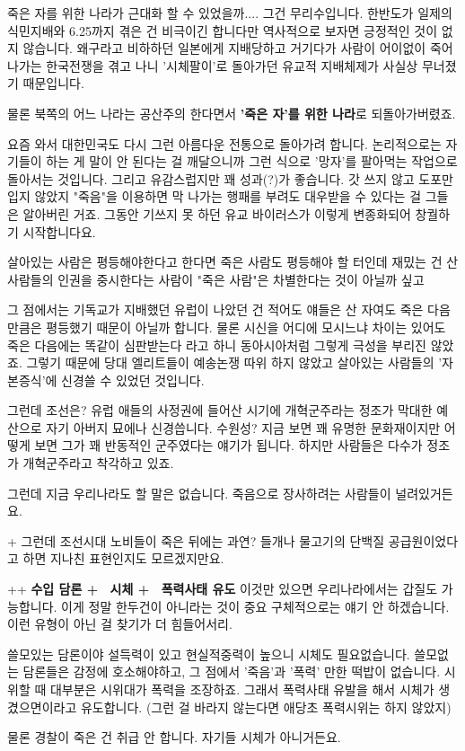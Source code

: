 죽은 자를 위한 나라가 근대화 할 수 있었을까.... 그건 무리수입니다.
한반도가 일제의 식민지배와 6.25까지 겪은 건 비극이긴 합니다만 역사적으로 보자면 긍정적인 것이 없지 않습니다.
왜구라고 비하하던 일본에게 지배당하고 거기다가 사람이 어이없이 죽어나가는 한국전쟁을 겪고 나니
'시체팔이'로 돌아가던 유교적 지배체제가 사실상 무너졌기 때문입니다.
\vspace{5mm}

물론 북쪽의 어느 나라는 공산주의 한다면서 \textbf{'죽은 자'를 위한 나라}로 되돌아가버렸죠.
\vspace{5mm}

요즘 와서 대한민국도 다시 그런 아름다운 전통으로 돌아가려 합니다.
논리적으로는 자기들이 하는 게 말이 안 된다는 걸 깨달으니까 그런 식으로 '망자'를 팔아먹는 작업으로 돌아서는 것입니다.
그리고 유감스럽지만 꽤 성과(?)가 좋습니다.
갓 쓰지 않고 도포만 입지 않았지 "죽음"을 이용하면 막 나가는 행패를 부려도 대우받을 수 있다는 걸 그들은 알아버린 거죠.
그동안 기쓰지 못 하던 유교 바이러스가 이렇게 변종화되어 창궐하기 시작합니다요.
\vspace{5mm}

살아있는 사람은 평등해야한다고 한다면 죽은 사람도 평등해야 할 터인데
재밌는 건 산 사람들의 인권을 중시한다는 사람이 "죽은 사람"은 차별한다는 것이 아닐까 싶고
\vspace{5mm}

그 점에서는 기독교가 지배했던 유럽이 나았던 건
적어도 얘들은 산 자여도 죽은 다음만큼은 평등했기 때문이 아닐까 합니다.
물론 시신을 어디에 모시느냐 차이는 있어도 죽은 다음에는 똑같이 심판받는다 라고 하니 동아시아처럼 그렇게 극성을 부리진 않았죠.
그렇기 때문에 당대 엘리트들이 예송논쟁 따위 하지 않았고 살아있는 사람들의 '자본증식'에 신경쓸 수 있었던 것입니다.
\vspace{5mm}

그런데 조선은? 유럽 애들의 사정권에 들어산 시기에 개혁군주라는 정조가 막대한 예산으로 자기 아버지 묘에나 신경씁니다.
수원성? 지금 보면 꽤 유명한 문화재이지만 어떻게 보면 그가 꽤 반동적인 군주였다는 얘기가 됩니다.
하지만 사람들은 다수가 정조가 개혁군주라고 착각하고 있죠.
\vspace{5mm}

그런데 지금 우리나라도 할 말은 없습니다. 죽음으로 장사하려는 사람들이 널려있거든요.
\vspace{5mm}

+ 그런데 조선시대 노비들이 죽은 뒤에는 과연?
들개나 물고기의 단백질 공급원이었다고 하면 지나친 표현인지도 모르겠지만요.
\vspace{5mm}

++ \textbf{수입 담론 +  시체 +  폭력사태 유도}
이것만 있으면 우리나라에서는 갑질도 가능합니다. 이게 정말 한두건이 아니라는 것이 중요
구체적으로는 얘기 안 하겠습니다. 이런 유형이 아닌 걸 찾기가 더 힘들어서리.
\vspace{5mm}

쓸모있는 담론이야 설득력이 있고 현실적중력이 높으니 시체도 필요없습니다.
쓸모없는 담론들은 감정에 호소해야하고, 그 점에서 '죽음'과 '폭력' 만한 떡밥이 없습니다.
시위할 때 대부분은 시위대가 폭력을 조장하죠. 그래서 폭력사태 유발을 해서 시체가 생겼으면이라고 유도합니다.
(그런 걸 바라지 않는다면 애당초 폭력시위는 하지 않았지)
\vspace{5mm}

물론 경찰이 죽은 건 취급 안 합니다. 자기들 시체가 아니거든요.
\vspace{5mm}





